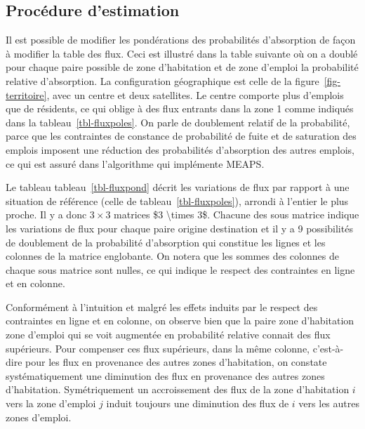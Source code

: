 \documentclass[
  10pt,
  a4paper,
  numbers=noendperiod,
  DIV=12]{scrartcl}
\begin{document}
\hypertarget{sec-estimation}{%
\subsection{Procédure d'estimation}\label{sec-estimation}}

Il est possible de modifier les pondérations des probabilités
d'absorption de façon à modifier la table des flux. Ceci est illustré
dans la table suivante où on a doublé pour chaque paire possible de zone
d'habitation et de zone d'emploi la probabilité relative d'absorption.
La configuration géographique est celle de la
figure~\ref{fig-territoire}, avec un centre et deux satellites. Le
centre comporte plus d'emplois que de résidents, ce qui oblige à des
flux entrants dans la zone 1 comme indiqués dans la
tableau~\ref{tbl-fluxpoles}. On parle de doublement relatif de la
probabilité, parce que les contraintes de constance de probabilité de
fuite et de saturation des emplois imposent une réduction des
probabilités d'absorption des autres emplois, ce qui est assuré dans
l'algorithme qui implémente MEAPS.

Le tableau tableau~\ref{tbl-fluxpond} décrit les variations de flux par
rapport à une situation de référence (celle de
tableau~\ref{tbl-fluxpoles}), arrondi à l'entier le plus proche. Il y a
donc \(3 \times 3\) matrices \$3 \textbackslash times 3\$. Chacune des
sous matrice indique les variations de flux pour chaque paire origine
destination et il y a 9 possibilités de doublement de la probabilité
d'absorption qui constitue les lignes et les colonnes de la matrice
englobante. On notera que les sommes des colonnes de chaque sous matrice
sont nulles, ce qui indique le respect des contraintes en ligne et en
colonne.

Conformément à l'intuition et malgré les effets induits par le respect
des contraintes en ligne et en colonne, on observe bien que la paire
zone d'habitation zone d'emploi qui se voit augmentée en probabilité
relative connait des flux supérieurs. Pour compenser ces flux
supérieurs, dans la même colonne, c'est-à-dire pour les flux en
provenance des autres zones d'habitation, on constate systématiquement
une diminution des flux en provenance des autres zones d'habitation.
Symétriquement un accroissement des flux de la zone d'habitation \(i\)
vers la zone d'emploi \(j\) induit toujours une diminution des flux de
\(i\) vers les autres zones d'emploi.
\end{document}
